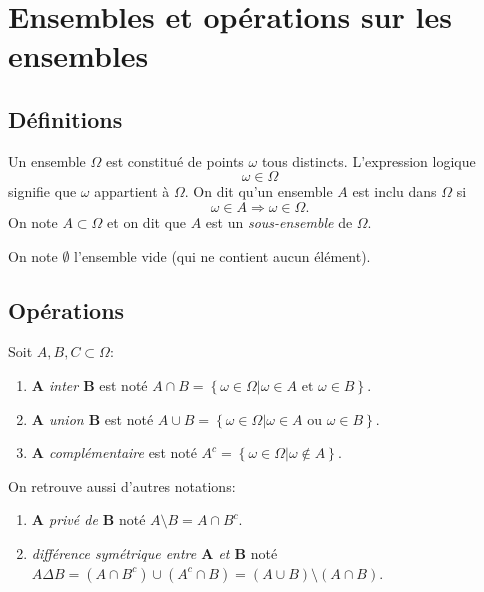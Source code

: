 \section[Ensembles]{Ensembles et opérations sur les ensembles}

\subsection{Définitions}

Un ensemble $\Omega$ est constitué de points $\omega$ tous distincts. L'expression logique 
\[
\omega \in \Omega
\]
signifie que $ \omega$ appartient à $\Omega$. On dit qu'un ensemble $A$ est inclu dans $\Omega$ si
\[
	\omega \in A \Rightarrow \omega\in\Omega.
\]
On note $A \subset \Omega$ et on dit que $A$ est un \emph{sous-ensemble} de $\Omega$.

\begin{definition}
	On note $ \emptyset$ l'ensemble vide (qui ne contient aucun élément).
\end{definition}

\sld{\vfill\pagebreak[5]}%


\subsection{Opérations}

\begin{definition}
	Soit $A,B,C \subset \Omega$:
	\begin{enumerate}
		\item \emph{$\boldsymbol A$ inter $\boldsymbol B$} est noté $A \cap B = \left\{ \omega \in \Omega | \omega \in A \text{ et } \omega\in B \right\}$. \pl{\rep{2cm}}
		\item \emph{$\boldsymbol A$ union $\boldsymbol B$} est noté $A \cup B = \left\{ \omega \in \Omega | \omega \in A \text{ ou } \omega\in B \right\}$. \pl{\rep{2cm}}
		\item \emph{$\boldsymbol A$ complémentaire} est noté $A^c = \left\{ \omega \in \Omega | \omega \notin A \right\}$.\pl{\rep{2cm}}
	\end{enumerate}
On retrouve aussi d'autres notations:
\begin{enumerate}
	\item \emph{$\boldsymbol A$ privé de $\boldsymbol B$} noté $A \setminus B = A \cap B^c$.\pl{\rep{2cm}}

	\item \emph{différence symétrique entre $\boldsymbol A$ et $\boldsymbol B$} noté $A \Delta B = (A \cap B^c) \cup ( A^c \cap B) = (A \cup B)  \setminus (A \cap B)$.\pl{\rep{2cm}}

\end{enumerate}
\end{definition}

